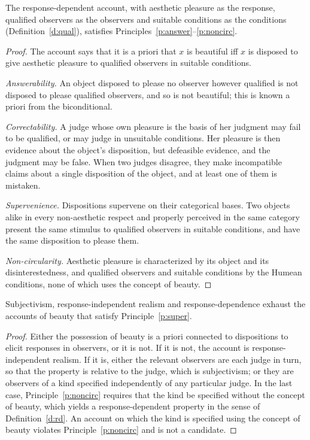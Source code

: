 \documentclass{situationist-preprint}
\begin{document}
\begin{proposition}\label{p:rdworks}
The response-dependent account, with aesthetic pleasure as the response, qualified observers as the observers and suitable conditions as the conditions (Definition~\ref{d:qual}), satisfies Principles~\ref{p:answer}--\ref{p:noncirc}.
\end{proposition}

\begin{proof}
The account says that it is a priori that $x$ is beautiful iff $x$ is disposed to give aesthetic pleasure to qualified observers in suitable conditions.

\emph{Answerability.} An object disposed to please no observer however qualified is not disposed to please qualified observers, and so is not beautiful; this is known a priori from the biconditional.

\emph{Correctability.} A judge whose own pleasure is the basis of her judgment may fail to be qualified, or may judge in unsuitable conditions. Her pleasure is then evidence about the object's disposition, but defeasible evidence, and the judgment may be false. When two judges disagree, they make incompatible claims about a single disposition of the object, and at least one of them is mistaken.

\emph{Supervenience.} Dispositions supervene on their categorical bases. Two objects alike in every non-aesthetic respect and properly perceived in the same category present the same stimulus to qualified observers in suitable conditions, and have the same disposition to please them.

\emph{Non-circularity.} Aesthetic pleasure is characterized by its object and its disinterestedness, and qualified observers and suitable conditions by the Humean conditions, none of which uses the concept of beauty.
\end{proof}

\begin{proposition}\label{p:exhaust}
Subjectivism, response-independent realism and response-dependence exhaust the accounts of beauty that satisfy Principle~\ref{p:super}.
\end{proposition}

\begin{proof}
Either the possession of beauty is a priori connected to dispositions to elicit responses in observers, or it is not. If it is not, the account is response-independent realism. If it is, either the relevant observers are each judge in turn, so that the property is relative to the judge, which is subjectivism; or they are observers of a kind specified independently of any particular judge. In the last case, Principle~\ref{p:noncirc} requires that the kind be specified without the concept of beauty, which yields a response-dependent property in the sense of Definition~\ref{d:rd}. An account on which the kind is specified using the concept of beauty violates Principle~\ref{p:noncirc} and is not a candidate.
\end{proof}
\end{document}
